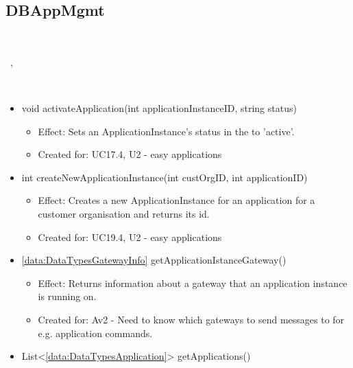   \subsection{DBAppMgmt}\label{int:OtherDataDatabaseOtherDataDBDBAppMgmt}
    \begin{description}
      \item[Provided by:] \iconcomponent{}~
      \item[Required by:] \iconcomponent{}~, \iconcomponent{}~
      \item[Operations:] ~
    \begin{itemize}[noitemsep,nolistsep,leftmargin=-.25cm]
      \item \textsf{void activateApplication(int applicationInstanceID, string status)}
        \begin{itemize}[noitemsep,nolistsep]
           \item Effect: Sets an ApplicationInstance's status in the  to 'active'.
\item Created for: UC17.4, U2 - easy applications
        \end{itemize}
      \item \textsf{int createNewApplicationInstance(int custOrgID, int applicationID)}
        \begin{itemize}[noitemsep,nolistsep]
           \item Effect: Creates a new ApplicationInstance for an application for a customer organisation and returns its id.
\item Created for: UC19.4, U2 - easy applications
        \end{itemize}
      \item \textsf{\ref{data:DataTypesGatewayInfo} getApplicationIstanceGateway()}
        \begin{itemize}[noitemsep,nolistsep]
           \item Effect: Returns information about a gateway that an application instance is running on.
\item  Created for: Av2 - Need to know which gateways to send messages to for e.g. application commands.
        \end{itemize}
      \item \textsf{List\textless{}\ref{data:DataTypesApplication}\textgreater{} getApplications()}

\end{itemize}
\end{description}
